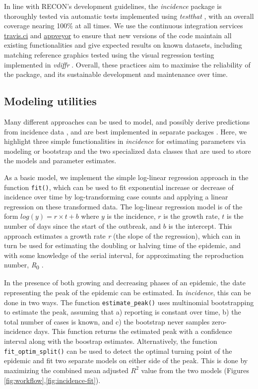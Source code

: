\documentclass[9pt,a4paper]{extarticle}
\let\cite\citep
\begin{document}
In line with RECON's development guidelines, the \textit{incidence} package is thoroughly tested via automatic tests implemented using \emph{testthat} \cite{Wickham2011-ec}, with an overall coverage nearing 100\% at all times.
We use the continuous integration services \href{https://travis-ci.org/}{travis.ci} and \href{https://ci.appveyor.com/}{appveyor} to ensure that new versions of the code maintain all existing functionalities and give expected results on known datasets, including matching reference graphics tested using the visual regression testing implemented in \emph{vdiffr} \cite{Henry2018-tx}.
Overall, these practices aim to maximise the reliability of the package, and its sustainable development and maintenance over time.

\subsection*{Modeling utilities}

Many different approaches can be used to model, and possibly derive predictions from incidence data \citep[e.g.][]{Wallinga2004-al,Cori2013-fc,Nouvellet2017-an}, and are best implemented in separate packages \citep[e.g.][]{Cori2013-fc}.
Here, we highlight three simple functionalities in \textit{incidence} for estimating parameters via modeling or bootstrap and the two specialized data classes that are used to store the models and parameter estimates.

As a basic model, we implement the simple log-linear regression approach in the function \texttt{fit()}, which can be used to fit exponential increase or decrease of incidence over time by log-transforming case counts and applying a linear regression on these transformed data.
The log-linear regression model is of the form \(log(y) = r \times t + b\) where \(y\) is the incidence, \(r\) is the growth rate, \(t\) is the number of days since the start of the outbreak, and \(b\) is the intercept.
This approach estimates a growth rate \emph{r} (the slope of the regression), which can in turn be used for estimating the doubling or halving time of the epidemic, and with some knowledge of the serial interval, for approximating the reproduction number, \emph{R}\textsubscript{0} \cite{Wallinga2007-hw}.

In the presence of both growing and decreasing phases of an epidemic, the date representing the peak of the epidemic can be estimated. 
In \textit{incidence}, this can be done in two ways. 
The function \texttt{estimate\_peak()} uses multinomial bootstrapping to estimate the peak, assuming that a) reporting is constant over time, b) the total number of cases is known, and c) the bootstrap never samples zero-incidence days. 
This function returns the estimated peak with a confidence interval along with the boostrap estimates.
Alternatively, the function \texttt{fit\_optim\_split()} can be used to detect the optimal turning point of the epidemic and fit two separate models on either side of the peak.
This is done by maximizing the combined mean adjusted $R^2$ value from the two models (Figures \ref{fig:workflow},\ref{fig:incidence-fit}).
\end{document}
